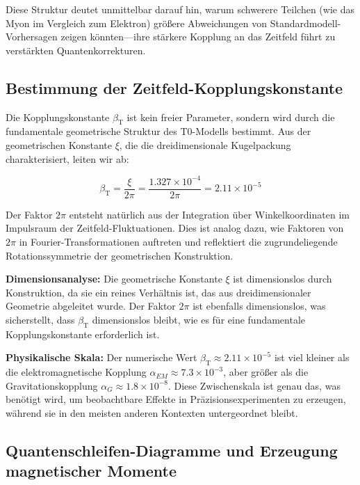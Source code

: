 \documentclass[12pt,a4paper]{article}
\newcommand{\betaT}{\beta_{\text{T}}}
\newcommand{\xigeom}{\xi}
\begin{document}
	Diese Struktur deutet unmittelbar darauf hin, warum schwerere Teilchen (wie das Myon im Vergleich zum Elektron) größere Abweichungen von Standardmodell-Vorhersagen zeigen könnten—ihre stärkere Kopplung an das Zeitfeld führt zu verstärkten Quantenkorrekturen.
	
	\subsection{Bestimmung der Zeitfeld-Kopplungskonstante}
	
	Die Kopplungskonstante $\betaT$ ist kein freier Parameter, sondern wird durch die fundamentale geometrische Struktur des T0-Modells bestimmt. Aus der geometrischen Konstante $\xigeom$, die die dreidimensionale Kugelpackung charakterisiert, leiten wir ab:
	
	\begin{equation}
		\betaT = \frac{\xigeom}{2\pi} = \frac{1.327 \times 10^{-4}}{2\pi} = 2.11 \times 10^{-5}
	\end{equation}
	
	Der Faktor $2\pi$ entsteht natürlich aus der Integration über Winkelkoordinaten im Impulsraum der Zeitfeld-Fluktuationen. Dies ist analog dazu, wie Faktoren von $2\pi$ in Fourier-Transformationen auftreten und reflektiert die zugrundeliegende Rotationssymmetrie der geometrischen Konstruktion.
	
	\textbf{Dimensionsanalyse:} Die geometrische Konstante $\xigeom$ ist dimensionslos durch Konstruktion, da sie ein reines Verhältnis ist, das aus dreidimensionaler Geometrie abgeleitet wurde. Der Faktor $2\pi$ ist ebenfalls dimensionslos, was sicherstellt, dass $\betaT$ dimensionslos bleibt, wie es für eine fundamentale Kopplungskonstante erforderlich ist.
	
	\textbf{Physikalische Skala:} Der numerische Wert $\betaT \approx 2.11 \times 10^{-5}$ ist viel kleiner als die elektromagnetische Kopplung $\alpha_{EM} \approx 7.3 \times 10^{-3}$, aber größer als die Gravitationskopplung $\alpha_G \approx 1.8 \times 10^{-8}$. Diese Zwischenskala ist genau das, was benötigt wird, um beobachtbare Effekte in Präzisionsexperimenten zu erzeugen, während sie in den meisten anderen Kontexten untergeordnet bleibt.
	
	\subsection{Quantenschleifen-Diagramme und Erzeugung magnetischer Momente}
	
\end{document}
